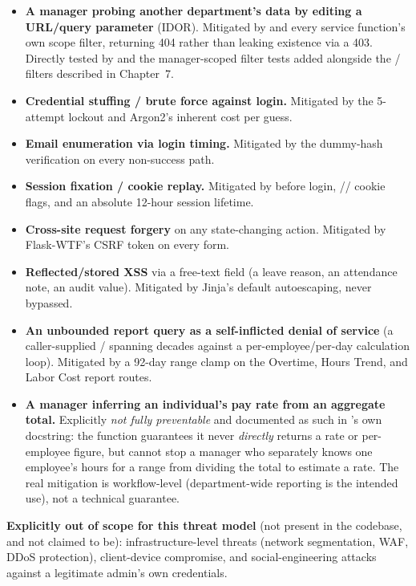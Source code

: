 \begin{itemize}
  \item \textbf{A manager probing another department's data by editing
        a URL/query parameter} (IDOR). Mitigated by
         and every service function's own
        scope filter, returning 404 rather than leaking existence via a
        403. Directly tested by 
        and the manager-scoped filter tests added alongside the
        / filters
        described in Chapter~7.
  \item \textbf{Credential stuffing / brute force against login.}
        Mitigated by the 5-attempt lockout and Argon2's inherent
        cost per guess.
  \item \textbf{Email enumeration via login timing.} Mitigated by the
        dummy-hash verification on every non-success path.
  \item \textbf{Session fixation / cookie replay.} Mitigated by
         before login, //
         cookie flags, and an absolute 12-hour session
        lifetime.
  \item \textbf{Cross-site request forgery} on any state-changing
        action. Mitigated by Flask-WTF's CSRF token on every form.
  \item \textbf{Reflected/stored XSS} via a free-text field (a leave
        reason, an attendance note, an audit  value).
        Mitigated by Jinja's default autoescaping, never bypassed.
  \item \textbf{An unbounded report query as a self-inflicted denial of
        service} (a caller-supplied /
        spanning decades against a per-employee/per-day calculation
        loop). Mitigated by a 92-day range clamp on the Overtime,
        Hours Trend, and Labor Cost report routes.
  \item \textbf{A manager inferring an individual's pay rate from an
        aggregate total.} Explicitly \emph{not fully preventable} and
        documented as such in 's
        own docstring: the function guarantees it never \emph{directly}
        returns a rate or per-employee figure, but cannot stop a
        manager who separately knows one employee's hours for a range
        from dividing the total to estimate a rate. The real mitigation
        is workflow-level (department-wide reporting is the intended
        use), not a technical guarantee.
\end{itemize}

\textbf{Explicitly out of scope for this threat model} (not present in
the codebase, and not claimed to be): infrastructure-level threats
(network segmentation, WAF, DDoS protection), client-device compromise,
and social-engineering attacks against a legitimate admin's own
credentials.
